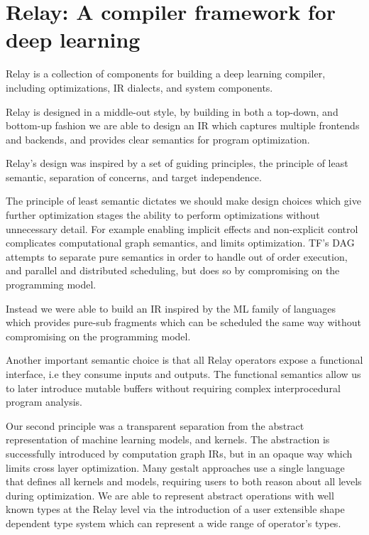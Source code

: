 \chapter{Relay: A compiler framework for deep learning}
\label{ch:relay}

Relay is a collection of components for building a deep learning compiler, including optimizations, IR dialects, and system components.

Relay is designed in a middle-out style, by building in both a top-down, and bottom-up fashion we are able to design an IR which captures multiple frontends and backends, and provides clear semantics for program optimization.

Relay’s design was inspired by a set of guiding principles, the principle of least semantic, separation of concerns, and target independence.

The principle of least semantic dictates we should make design choices which give further optimization stages the ability to perform optimizations without unnecessary detail. For example enabling implicit effects and non-explicit control complicates computational graph semantics, and limits optimization. TF’s DAG attempts to separate pure semantics in order to handle out of order execution, and parallel and distributed scheduling, but does so by compromising on the programming model.

Instead we were able to build an IR inspired by the ML family of languages which provides pure-sub fragments which can be scheduled the same way without compromising on the programming model.

Another important semantic choice is that all Relay operators expose a functional interface, i.e they consume inputs and outputs. The functional semantics allow us to later introduce mutable buffers without requiring complex interprocedural program analysis.

Our second principle was a transparent separation from the abstract representation of machine learning models, and kernels. The abstraction is successfully introduced by computation graph IRs, but in an opaque way which limits cross layer optimization. Many gestalt approaches use a single language that defines all kernels and models, requiring users to both reason about all levels during optimization. We are able to represent abstract operations with well known types at the Relay level via the introduction of a user extensible shape dependent type system which can represent a wide range of operator’s types.

